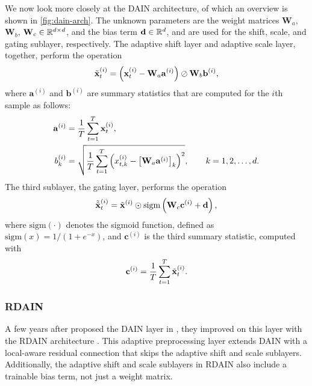 \documentclass{statsmsc}
\begin{document}
{We now look more closely at  the \ac{DAIN} architecture, of which an overview is shown
in \cref{fig:dain-arch}. The unknown parameters are the weight matrices
$\mathbf{W}_a$, $\mathbf{W}_b$, $\mathbf{W}_c \in \mathbb{R}^{d \times d}$, and the bias
term $\mathbf{d} \in \mathbb{R}^d$, and are used
for the shift, scale, and gating sublayer, respectively. The adaptive shift layer and
adaptive scale layer, together, perform the operation
\begin{equation}\label{eq:dain_tild}
    \tilde{\mathbf{x}}_t^{(i)}=\left(
        \mathbf{x}_t^{(i)}-\mathbf{W}_a \mathbf{a}^{(i)}
    \right) \oslash \mathbf{W}_b \mathbf{b}^{(i)},
\end{equation}
where $\mathbf{a}^{(i)}$ and $\mathbf{b}^{(i)}$ are summary statistics that are computed for
the $i$th sample as follows:
\begin{align}
    \mathbf{a}^{(i)}& =\frac{1}{T} \sum^{T}_{t=1} \mathbf{x}_t^{(i)}, \label{eq:dain_a}\\
    b_k^{(i)}&=\sqrt{
    \frac{1}{T} \sum^{T}_{t=1} \left(x^{(i)}_{t,k} - \left[\mathbf{W}_a  \mathbf{a}^{(i)}\right]_k \right)^2},
    \qquad k=1,2,\dots,d. \label{eq:dain_b}
\end{align}
The third sublayer, the gating layer, performs the operation
\begin{equation}
    \tilde{\tilde{\mathbf{x}}}_t^{(i)}=\tilde{\mathbf{x}}^{(i)} \odot \textrm{sigm}\left( \mathbf{W}_c \mathbf{c}^{(i)} + \mathbf{d}\right),
\end{equation}
where $\textrm{sigm}(\cdot)$ denotes the sigmoid function, defined as
$\textrm{sigm}(x)=1/(1+e^{-x})$, and $\mathbf{c}^{(i)}$ is the third summary statistic, computed
with
\begin{equation}
    \mathbf{c}^{(i)}=\frac{1}{T} \sum^{T}_{t=1} \tilde{\mathbf{x}}_t^{(i)}.
\end{equation}


\subsubsection{RDAIN}%
\label{ssub:RDAIN}

A few years after \citeauthor{dain} proposed the \ac{DAIN} layer in \citeyear{dain}, they
improved on
this layer with the \acf{RDAIN} architecture \citep{rdain}. This adaptive preprocessing layer
extends \ac{DAIN} with a local-aware residual connection that skips the adaptive shift and
scale sublayers. Additionally, the adaptive shift and scale sublayers in \ac{RDAIN} also
include a trainable bias term, not just a weight matrix.

}
\end{document}
